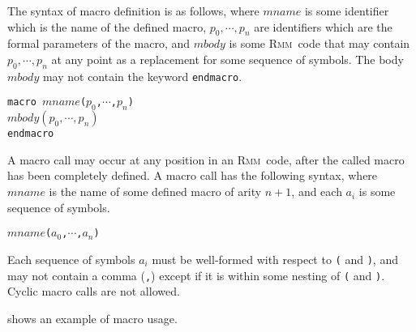 \documentclass[a4paper]{article}
\newcommand{\rmm}{\textsc{Rmm}}
\begin{document}
The syntax of macro definition is as follows, where $mname$ is some
identifier which is the name of the defined macro, $p_0,\cdots,p_n$
are identifiers which are the formal parameters of the macro, and
$mbody$ is some \rmm\ code that may contain $p_0,\cdots,p_n$ at any
point as a replacement for some sequence of symbols. The body $mbody$
may not contain the keyword {\tt endmacro}.

\vspace{15pt}

\noindent
{\tt macro }$mname${\tt (}$p_0${\tt ,}$\cdots${\tt ,}$p_n${\tt)}\\
$mbody(p_0,\cdots,p_n)$\\
{\tt endmacro}\\

\vspace{15pt}

A macro call may occur at any position in an \rmm\ code, after the
called macro has been completely defined. A macro call has the
following syntax, where $mname$ is the name of some defined macro of
arity $n+1$, and each $a_i$ is some sequence of symbols.

\vspace{15pt}

\noindent
$mname${\tt (}$a_0${\tt ,}$\cdots${\tt ,}$a_n${\tt )}\\

\vspace{15pt}

Each sequence of symbols $a_i$ must be well-formed with respect to
{\tt (} and {\tt )}, and may not contain a comma ({\tt ,}) except if
it is within some nesting of {\tt (} and {\tt )}. Cyclic macro calls
are not allowed.

 shows an example of macro usage.
\end{document}
